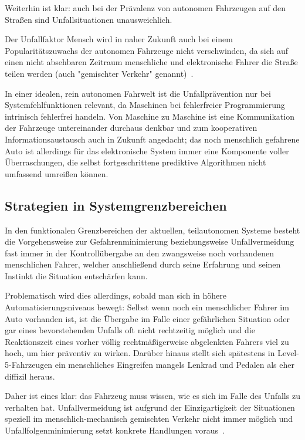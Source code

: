\documentclass[twocolumn, german]{tum-article}
\begin{document}
Weiterhin ist klar: auch bei der Prävalenz von autonomen Fahrzeugen auf den Straßen sind Unfallsituationen unausweichlich.

Der Unfallfaktor Mensch wird in naher Zukunft auch bei einem Popularitätszuwachs der autonomen Fahrzeuge nicht verschwinden, da sich auf einen nicht absehbaren Zeitraum menschliche und elektronische Fahrer die Straße teilen werden (auch "gemischter Verkehr" genannt)~\cite[S. 1278]{nyholm-ethics}.

In einer idealen, rein autonomen Fahrwelt ist die Unfallprävention nur bei Systemfehlfunktionen relevant, da Maschinen bei fehlerfreier Programmierung intrinisch fehlerfrei handeln.
Von Maschine zu Maschine ist eine Kommunikation der Fahrzeuge untereinander durchaus denkbar und zum kooperativen Informationsaustausch auch in Zukunft angedacht; das noch menschlich gefahrene Auto ist allerdings für das elektronische System immer eine Komponente voller Überraschungen, die selbst fortgeschrittene prediktive Algorithmen nicht umfassend umreißen können.


\subsection{Strategien in Systemgrenzbereichen}
In den funktionalen Grenzbereichen der aktuellen, teilautonomen Systeme besteht die Vorgehensweise zur Gefahrenminimierung beziehungsweise Unfallvermeidung fast immer in der Kontrollübergabe an den zwangsweise noch vorhandenen menschlichen Fahrer, welcher anschließend durch seine Erfahrung und seinen Instinkt die Situation entschärfen kann.

Problematisch wird dies allerdings, sobald man sich in höhere Automatisierungsniveaus bewegt:
Selbst wenn noch ein menschlicher Fahrer im Auto vorhanden ist, ist die Übergabe im Falle einer gefährlichen Situation oder gar eines bevorstehenden Unfalls oft nicht rechtzeitig möglich und die Reaktionszeit eines vorher völlig rechtmäßigerweise abgelenkten Fahrers viel zu hoch, um hier präventiv zu wirken.
Darüber hinaus stellt sich spätestens in Level-5-Fahrzeugen ein menschliches Eingreifen mangels Lenkrad und Pedalen als eher diffizil heraus.

Daher ist eines klar: das Fahrzeug muss wissen, wie es sich im Falle des Unfalls zu verhalten hat.
Unfallvermeidung ist aufgrund der Einzigartigkeit der Situationen speziell im menschlich-mechanisch gemischten Verkehr nicht immer möglich und Unfallfolgenminimierung setzt konkrete Handlungen voraus~\cite[S. 71]{maurer-autonomous}.
\end{document}
